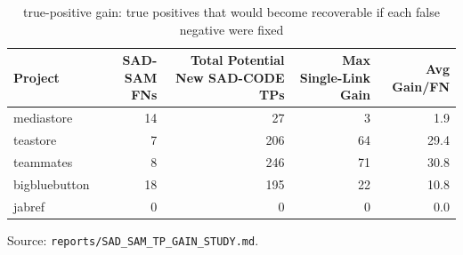 \begin{table}[htbp]
  \centering
  \caption{\sadsam true-positive gain: \sadcode true positives that would become recoverable if each \sadsam false negative were fixed}
  \label{tab:sadsam-tp-gain}
  \begin{tabular}{lrrrr}
    \toprule
    Project & SAD-SAM FNs & Total Potential New SAD-CODE TPs & Max Single-Link Gain & Avg Gain/FN \\
    \midrule
    mediastore & 14 & 27 & 3 & 1.9 \\
    teastore & 7 & 206 & 64 & 29.4 \\
    teammates & 8 & 246 & 71 & 30.8 \\
    bigbluebutton & 18 & 195 & 22 & 10.8 \\
    jabref & 0 & 0 & 0 & 0.0 \\
    \bottomrule
  \end{tabular}
  \par\smallskip\footnotesize Source: \texttt{reports/SAD\_SAM\_TP\_GAIN\_STUDY.md}.
\end{table}
